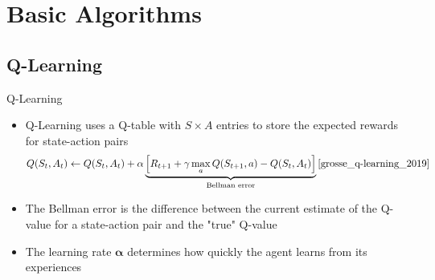 \documentclass[xcolor=dvipsnames]{beamer}
\begin{document}

\section{Basic Algorithms}
\subsection{Q-Learning}
\begin{frame}{Q-Learning}
    \begin{itemize}
        \item \alert{Q-Learning} uses a Q-table with $S \times A$ entries to store the expected rewards for state-action pairs
        \begin{equation*}
            Q(S_t, A_t) \leftarrow Q(S_t, A_t) + \alpha \underbrace{\Bigl[R_{t+1} + \gamma \max_a Q(S_{t+1}, a) - Q(S_t, A_t)\Bigr]}_\text{Bellman error} \cite{grosse_q-learning_2019}
        \end{equation*}
        \item The \alert{Bellman error} is the difference between the current estimate of the Q-value for a state-action pair and the "true" Q-value
        \item The learning rate $\boldsymbol{\alpha}$ determines how quickly the agent learns from its experiences
    \end{itemize}
\end{frame}
\end{document}
